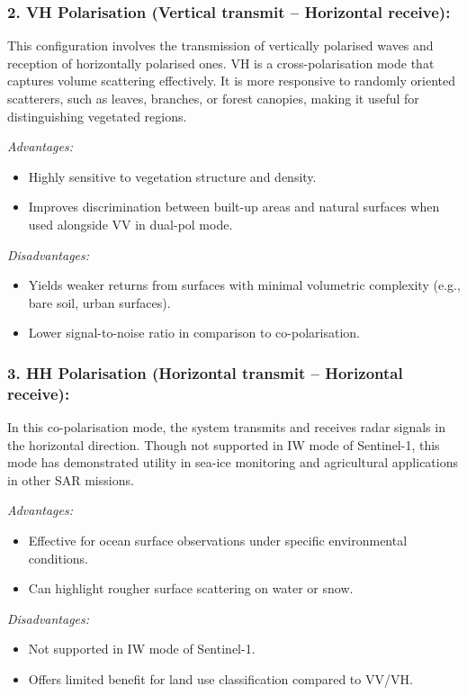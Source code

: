 \subsubsection{\textbf{2. VH Polarisation (Vertical transmit – Horizontal receive):}}

This configuration involves the transmission of vertically polarised waves and reception of horizontally polarised ones. VH is a cross-polarisation mode that captures volume scattering effectively. It is more responsive to randomly oriented scatterers, such as leaves, branches, or forest canopies, making it useful for distinguishing vegetated regions.


\textit{Advantages:}
\begin{itemize}
    \item Highly sensitive to vegetation structure and density.
    \item Improves discrimination between built-up areas and natural surfaces when used alongside VV in dual-pol mode.
\end{itemize}

\textit{Disadvantages:}
\begin{itemize}
    \item Yields weaker returns from surfaces with minimal volumetric complexity (e.g., bare soil, urban surfaces).
    \item Lower signal-to-noise ratio in comparison to co-polarisation.
\end{itemize}

\subsubsection{\textbf{3. HH Polarisation (Horizontal transmit – Horizontal receive):}}

In this co-polarisation mode, the system transmits and receives radar signals in the horizontal direction. Though not supported in IW mode of Sentinel-1, this mode has demonstrated utility in sea-ice monitoring and agricultural applications in other SAR missions.


\textit{Advantages:}
\begin{itemize}
    \item Effective for ocean surface observations under specific environmental conditions.
    \item Can highlight rougher surface scattering on water or snow.
\end{itemize}

\textit{Disadvantages:}
\begin{itemize}
    \item Not supported in IW mode of Sentinel-1.
    \item Offers limited benefit for land use classification compared to VV/VH.
\end{itemize}

